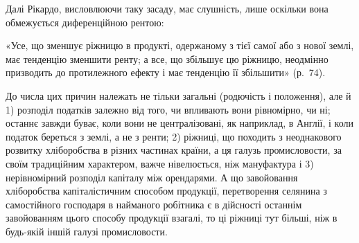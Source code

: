Далі Рікардо, висловлюючи таку засаду, має слушність, лише оскільки вона
обмежується диференційною рентою:

«Усе, що зменшує ріжницю в продукті, одержаному з тієї самої або з
нової землі, має тенденцію зменшити ренту; а все, що збільшує цю ріжницю,
неодмінно призводить до протилежного ефекту і має тенденцію її збільшити»
(р.~74).

До числа цих причин належать не тільки загальні (родючість і положення),
але й 1) розподіл податків залежно від того, чи впливають вони
рівномірно, чи ні; останнє завжди буває, коли вони не централізовані, як наприклад,
в Англії, і коли податок береться з землі, а не з ренти; 2) ріжниці,
що походить з неоднакового розвитку хліборобства в різних частинах країни,
а ця галузь промисловости, за своїм традиційним характером, важче нівелюється,
ніж мануфактура і 3) нерівномірний розподіл капіталу між орендарями.
А що завойовання хліборобства капіталістичним способом продукції, перетворення
селянина з самостійного господаря в найманого робітника є в дійсності останнім
завойованням цього способу продукції взагалі, то ці ріжниці тут більші,
ніж в будь-якій іншій галузі промисловости.
